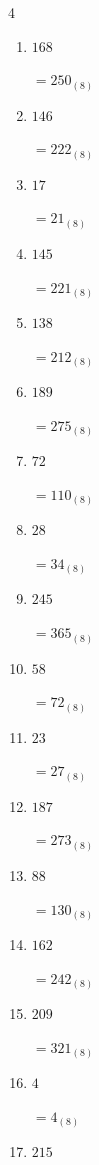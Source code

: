 \begin{multicols}{4}
\begin{enumerate}
  \item $168$

        $=250_{(8)}$

  \item $146$

        $=222_{(8)}$

  \item $17$

        $=21_{(8)}$

  \item $145$

        $=221_{(8)}$

  \item $138$

        $=212_{(8)}$

  \item $189$

        $=275_{(8)}$

  \item $72$

        $=110_{(8)}$

  \item $28$

        $=34_{(8)}$

  \item $245$

        $=365_{(8)}$

  \item $58$

        $=72_{(8)}$

  \item $23$

        $=27_{(8)}$

  \item $187$

        $=273_{(8)}$

\columnbreak %

  \item $88$

        $=130_{(8)}$

  \item $162$

        $=242_{(8)}$

  \item $209$

        $=321_{(8)}$

  \item $4$

        $=4_{(8)}$

  \item $215$


\end{enumerate}
\end{multicols}
